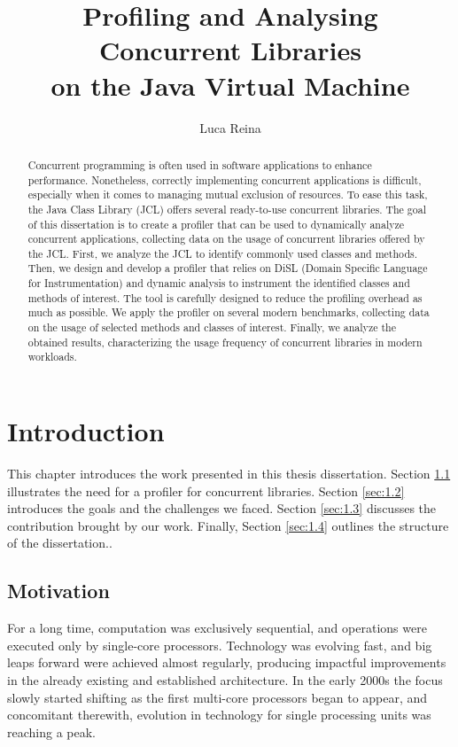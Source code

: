\documentclass[]{usiinfthesis}
\title{Profiling and Analysing Concurrent Libraries\\ on the Java Virtual Machine}
\author{Luca Reina}
\begin{document}
\maketitle
\frontmatter
\begin{abstract}

\large
Concurrent programming is often used in software applications to enhance performance. Nonetheless, correctly implementing concurrent applications is difficult, especially when it comes to managing mutual exclusion of resources. To ease this task, the Java Class Library (JCL) offers several ready-to-use concurrent libraries. \newline The goal of this dissertation is to create a profiler that can be used to dynamically analyze concurrent applications, collecting data on the usage of concurrent libraries offered by the JCL. \newline First, we analyze the JCL to identify commonly used classes and methods. Then, we design and develop a profiler that relies on DiSL (Domain Specific Language for Instrumentation) and dynamic analysis to instrument the identified classes and methods of interest. The tool is carefully designed to reduce the profiling overhead as much as possible. We apply the profiler on several modern benchmarks, collecting data on the usage of selected methods and classes of interest. Finally, we analyze the obtained results, characterizing the usage frequency of concurrent libraries in modern workloads.
\end{abstract}
\tableofcontents
\listoffigures
\listoftables
\mainmatter
\chapter{Introduction}
\large
This chapter introduces the work presented in this thesis dissertation. Section \ref{sec:1.1} illustrates the need for a profiler for concurrent libraries. Section \ref{sec:1.2} introduces the goals and the challenges we faced. Section \ref{sec:1.3} discusses the contribution brought by our work. Finally, Section \ref{sec:1.4} outlines the structure of the dissertation..

\section{Motivation} \label{sec:1.1}
For a long time, computation was exclusively sequential, and operations were executed only by single-core processors. Technology was evolving fast, and big leaps forward were achieved almost regularly, producing impactful improvements in the already existing and established architecture. In the early 2000s the focus slowly started shifting as the first multi-core processors began to appear, and concomitant therewith, evolution in technology for single processing units was reaching a peak. 
\end{document}
